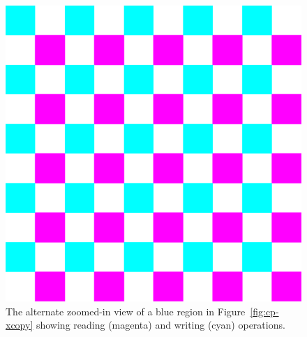 \begin{figure}[htb]
\begin{center}
\includegraphics[width=0.10\columnwidth]{lviz/cp-zoom.png}
\caption{The alternate zoomed-in view of a blue region in
Figure~\ref{fig:cp-xcopy} showing reading (magenta) and writing (cyan) operations.
}
\label{fig:cp-zoom}
\end{center}
\end{figure}

%
%

%
%
